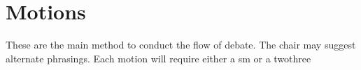 \chapter{Motions}
These are the main method to conduct the flow of debate.
The chair may suggest alternate phrasings. Each motion will require either a \gls{sm} or a \gls{twothree}